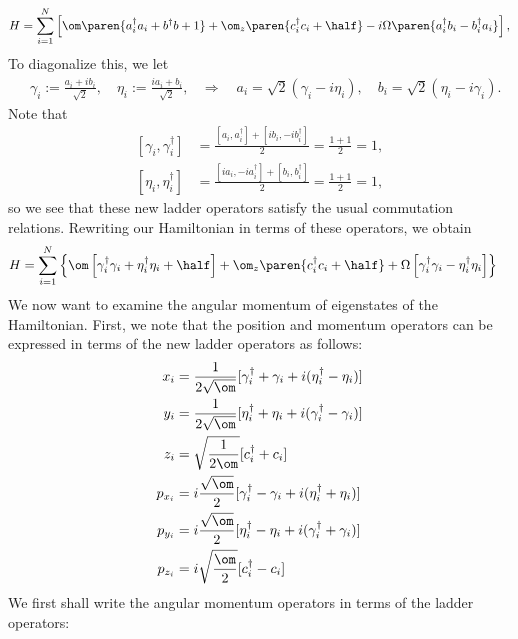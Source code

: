 \documentclass{article}
\begin{document}
$$
\begin{aligned}
H
&= \sum_{i=1}^N \left[\om\paren{a_i^\dagger a_i + b^\dagger b + 1} +  \om_z\paren{c_i^\dagger c_i + \half} - i\Omega\paren{a_i^\dagger b_i - b_i^\dagger a_i}\right],\\
\end{aligned}
$$
To diagonalize this, we let
$$
\begin{aligned}
&\gamma_i := \frac{a_i + i b_i}{\sqrt{2}}, \quad \eta_i := \frac{i a_i + b_i}{\sqrt{2}},
&\Rightarrow\quad a_i = \sqrt{2}(\gamma_i - i \eta_i), \quad b_i = \sqrt{2}(\eta_i - i \gamma_i).
\end{aligned}
$$
Note that
$$
\begin{aligned}
\left[\gamma_i,\gamma_i^\dagger\right] &=
  \frac{\left[a_i,a_i^\dagger\right] +
  \left[ib_i,-ib_i^\dagger\right]}{2} = \frac{1+1}{2} = 1,\\
\left[\eta_i,\eta_i^\dagger\right] &=
  \frac{\left[i a_i,-i a_i^\dagger\right] +
  \left[b_i,b_i^\dagger\right]}{2} = \frac{1+1}{2} = 1,
\end{aligned}
$$
so we see that these new ladder operators satisfy the usual
commutation relations.  Rewriting our Hamiltonian in terms of these
operators, we obtain
$$
\begin{aligned}
H
&=  \sum_{i=1}^N \left\{\om\left[\gamma_i^\dagger\gamma_i + \eta_i^\dagger\eta_i + \half\right] + \om_z\paren{c_i^\dagger c_i + \half}+ \Omega\left[\gamma_i^\dagger\gamma_i - \eta_i^\dagger\eta_i\right]\right\}
\end{aligned}
$$
We now want to examine the angular momentum of eigenstates of the Hamiltonian.
First, we note that the position and momentum operators can be expressed in terms of the new ladder operators as follows:
$$
\begin{aligned}[]
x_i &= \frac{1}{2\sqrt{\om}}[\gamma_i^\dagger + \gamma_i+ i(\eta_i^\dagger-\eta_i)]\\
y_i &= \frac{1}{2\sqrt{\om}}[\eta_i^\dagger + \eta_i+ i(\gamma_i^\dagger-\gamma_i)]\\
z_i &= \sqrt{\frac{1}{2\om}}[c_i^\dagger + c_i]\\
p_{x_i} &= i\frac{\sqrt{\om}}{2}[\gamma_i^\dagger - \gamma_i + i(\eta_i^\dagger + \eta_i)]\\
p_{y_i} &=i\frac{\sqrt{\om}}{2}[\eta_i^\dagger - \eta_i + i(\gamma_i^\dagger +\gamma_i)]\\
p_{z_i} &=i\sqrt{\frac{\om}{2}}[c_i^\dagger - c_i]\\
\end{aligned}
$$
We first shall write the angular momentum operators in terms of the ladder operators:
\end{document}
